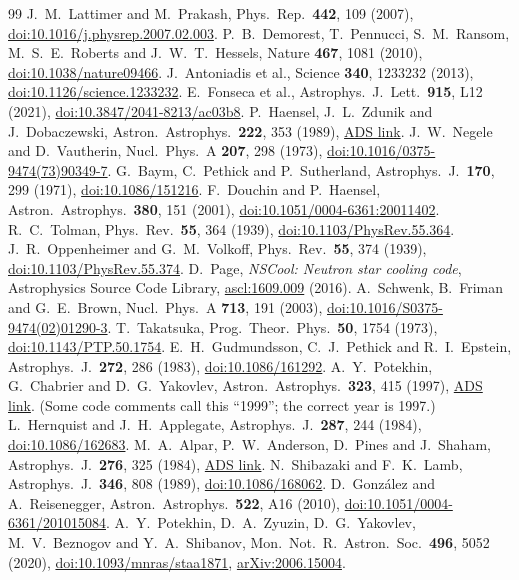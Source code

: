\documentclass[11pt,a4paper]{article}
\newcommand{\doi}[1]{\href{https://doi.org/#1}{doi:#1}}
\newcommand{\arxiv}[1]{\href{https://arxiv.org/abs/#1}{arXiv:#1}}
\newcommand{\ads}[1]{\href{https://ui.adsabs.harvard.edu/abs/#1}{ADS link}}
\begin{document}
\begin{thebibliography}{99}
 J.~M.~Lattimer and M.~Prakash, Phys.\ Rep.\ \textbf{442}, 109 (2007), \doi{10.1016/j.physrep.2007.02.003}.
 P.~B.~Demorest, T.~Pennucci, S.~M.~Ransom, M.~S.~E.~Roberts and J.~W.~T.~Hessels, Nature \textbf{467}, 1081 (2010), \doi{10.1038/nature09466}.
 J.~Antoniadis et al., Science \textbf{340}, 1233232 (2013), \doi{10.1126/science.1233232}.
 E.~Fonseca et al., Astrophys.\ J.\ Lett.\ \textbf{915}, L12 (2021), \doi{10.3847/2041-8213/ac03b8}.
 P.~Haensel, J.~L.~Zdunik and J.~Dobaczewski, Astron.\ Astrophys.\ \textbf{222}, 353 (1989), \ads{1989A\%26A...222..353H}.
 J.~W.~Negele and D.~Vautherin, Nucl.\ Phys.\ A \textbf{207}, 298 (1973), \doi{10.1016/0375-9474(73)90349-7}.
 G.~Baym, C.~Pethick and P.~Sutherland, Astrophys.\ J.\ \textbf{170}, 299 (1971), \doi{10.1086/151216}.
 F.~Douchin and P.~Haensel, Astron.\ Astrophys.\ \textbf{380}, 151 (2001), \doi{10.1051/0004-6361:20011402}.
 R.~C.~Tolman, Phys.\ Rev.\ \textbf{55}, 364 (1939), \doi{10.1103/PhysRev.55.364}.
 J.~R.~Oppenheimer and G.~M.~Volkoff, Phys.\ Rev.\ \textbf{55}, 374 (1939), \doi{10.1103/PhysRev.55.374}.
 D.~Page, \emph{NSCool: Neutron star cooling code}, Astrophysics Source Code Library, \href{https://ascl.net/1609.009}{ascl:1609.009} (2016).
 A.~Schwenk, B.~Friman and G.~E.~Brown, Nucl.\ Phys.\ A \textbf{713}, 191 (2003), \doi{10.1016/S0375-9474(02)01290-3}.
 T.~Takatsuka, Prog.\ Theor.\ Phys.\ \textbf{50}, 1754 (1973), \doi{10.1143/PTP.50.1754}.
 E.~H.~Gudmundsson, C.~J.~Pethick and R.~I.~Epstein, Astrophys.\ J.\ \textbf{272}, 286 (1983), \doi{10.1086/161292}.
 A.~Y.~Potekhin, G.~Chabrier and D.~G.~Yakovlev, Astron.\ Astrophys.\ \textbf{323}, 415 (1997), \ads{1997A\%26A...323..415P}. (Some code comments call this ``1999''; the correct year is 1997.)
 L.~Hernquist and J.~H.~Applegate, Astrophys.\ J.\ \textbf{287}, 244 (1984), \doi{10.1086/162683}.
 M.~A.~Alpar, P.~W.~Anderson, D.~Pines and J.~Shaham, Astrophys.\ J.\ \textbf{276}, 325 (1984), \ads{1984ApJ...276..325A}.
 N.~Shibazaki and F.~K.~Lamb, Astrophys.\ J.\ \textbf{346}, 808 (1989), \doi{10.1086/168062}.
 D.~Gonz\'alez and A.~Reisenegger, Astron.\ Astrophys.\ \textbf{522}, A16 (2010), \doi{10.1051/0004-6361/201015084}.
 A.~Y.~Potekhin, D.~A.~Zyuzin, D.~G.~Yakovlev, M.~V.~Beznogov and Y.~A.~Shibanov, Mon.\ Not.\ R.\ Astron.\ Soc.\ \textbf{496}, 5052 (2020), \doi{10.1093/mnras/staa1871}, \arxiv{2006.15004}.

\end{thebibliography}
\end{document}
